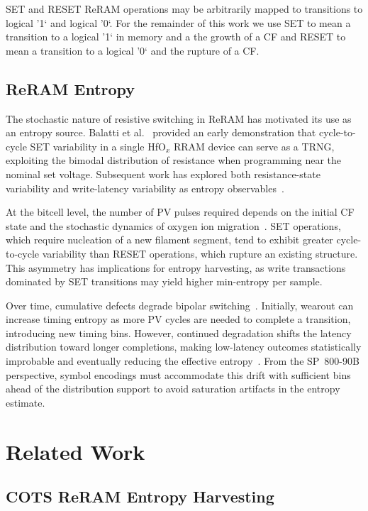 SET and RESET ReRAM operations may be arbitrarily mapped to transitions to logical '1` and logical '0`. For the remainder of this work we use SET to mean a transition to a logical '1` in memory and a the growth of a CF and RESET to mean a transition to a logical '0` and the rupture of a CF.

\subsection{ReRAM Entropy}

The stochastic nature of resistive switching in ReRAM has motivated its use as an entropy source.  Balatti et al.~\cite{balatti2015true} provided an early demonstration that cycle-to-cycle SET variability in a single HfO$_x$ RRAM device can serve as a TRNG, exploiting the bimodal distribution of resistance when programming near the nominal set voltage. Subsequent work has explored both resistance-state variability and write-latency variability as entropy observables~\cite{suri2018high, pang2019memristors, tolga2024trng}.

At the bitcell level, the number of PV pulses required depends on the initial CF state and the stochastic dynamics of oxygen ion migration~\cite{yu2012switching, wei2008highly}.  SET operations, which require nucleation of a new filament segment, tend to exhibit greater cycle-to-cycle variability than RESET operations, which rupture an existing structure.  This asymmetry has implications for entropy harvesting, as write transactions dominated by SET transitions may yield higher
min-entropy per sample.

Over time, cumulative defects degrade bipolar switching~\cite{chen2011physical, hayakawa2017resolving}.  Initially, wearout can increase timing entropy as more PV cycles are needed to complete a transition, introducing new timing bins.  However, continued degradation shifts the latency distribution toward longer completions, making low-latency outcomes statistically improbable and eventually reducing the effective entropy~\cite{fukuyama2019comprehensive}.  From the SP~800-90B perspective, symbol encodings must accommodate this drift with sufficient bins ahead of the distribution support to avoid saturation artifacts in the entropy estimate.

\section{Related Work}

\subsection{COTS ReRAM Entropy Harvesting}


